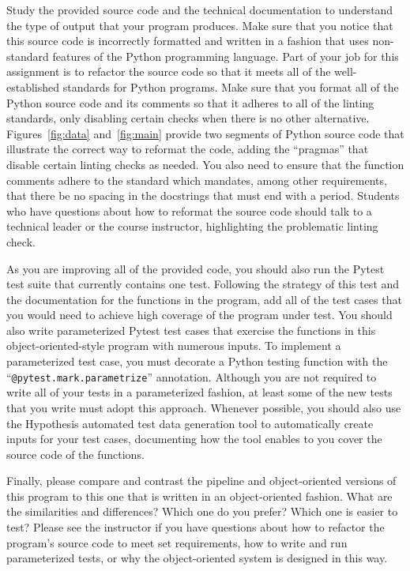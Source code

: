 \documentclass[11pt]{article}
\newcommand{\command}[1]{``\lstinline{#1}''}
\begin{document}
Study the provided source code and the technical documentation to understand the
type of output that your program produces.
%
Make sure that you notice that this source code is incorrectly formatted and
written in a fashion that uses non-standard features of the Python programming
language.
%
Part of your job for this assignment is to refactor the source code so that it
meets all of the well-established standards for Python programs.
%
Make sure that you format all of the Python source code and its comments so that
it adheres to all of the linting standards, only disabling certain checks when
there is no other alternative.
%
Figures~\ref{fig:data} and~\ref{fig:main} provide two segments of Python source
code that illustrate the correct way to reformat the code, adding the
``pragmas'' that disable certain linting checks as needed.
%
You also need to ensure that the function comments adhere to the standard which
mandates, among other requirements, that there be no spacing in the docstrings
that must end with a period.
%
Students who have questions about how to reformat the source code should talk to
a technical leader or the course instructor, highlighting the problematic
linting check.

As you are improving all of the provided code, you should also run the Pytest
test suite that currently contains one test. Following the strategy of this test
and the documentation for the functions in the program, add all of the test
cases that you would need to achieve high coverage of the program under test.
%
You should also write parameterized Pytest test cases that exercise the
functions in this object-oriented-style program with numerous inputs. To
implement a parameterized test case, you must decorate a Python testing function
with the \command{@pytest.mark.parametrize} annotation.
%
Although you are not required to write all of your tests in a parameterized
fashion, at least some of the new tests that you write must adopt this approach.
%
Whenever possible, you should also use the Hypothesis automated test data
generation tool to automatically create inputs for your test cases, documenting
how the tool enables to you cover the source code of the functions.

Finally, please compare and contrast the pipeline and object-oriented versions
of this program to this one that is written in an object-oriented fashion. What
are the similarities and differences? Which one do you prefer? Which one is
easier to test?
%
Please see the instructor if you have questions about how to refactor the
program's source code to meet set requirements, how to write and run
parameterized tests, or why the object-oriented system is designed in this way.
\end{document}
